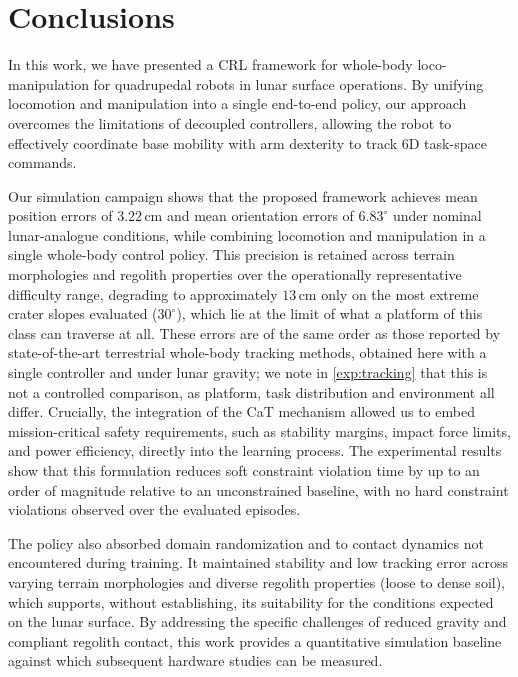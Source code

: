 \section{Conclusions} \label{sec:conclusions}

In this work, we have presented a CRL framework for whole-body loco-manipulation for quadrupedal robots in lunar surface operations. By unifying locomotion and manipulation into a single end-to-end policy, our approach overcomes the limitations of decoupled controllers, allowing the robot to effectively coordinate base mobility with arm dexterity to track 6D task-space commands.

Our simulation campaign shows that the proposed framework achieves mean position errors of $3.22\,$cm and mean orientation errors of $6.83^{\circ}$ under nominal lunar-analogue conditions, while combining locomotion and manipulation in a single whole-body control policy. This precision is retained across terrain morphologies and regolith properties over the operationally representative difficulty range, degrading to approximately $13\,$cm only on the most extreme crater slopes evaluated ($30^{\circ}$), which lie at the limit of what a platform of this class can traverse at all. These errors are of the same order as those reported by state-of-the-art terrestrial whole-body tracking methods, obtained here with a single controller and under lunar gravity; we note in \cref{exp:tracking} that this is not a controlled comparison, as platform, task distribution and environment all differ. Crucially, the integration of the CaT mechanism allowed us to embed mission-critical safety requirements, such as stability margins, impact force limits, and power efficiency, directly into the learning process. The experimental results show that this formulation reduces soft constraint violation time by up to an order of magnitude relative to an unconstrained baseline, with no hard constraint violations observed over the evaluated episodes.

The policy also absorbed domain randomization and to contact dynamics not encountered during training. It maintained stability and low tracking error across varying terrain morphologies and diverse regolith properties (loose to dense soil), which supports, without establishing, its suitability for the conditions expected on the lunar surface. By addressing the specific challenges of reduced gravity and compliant regolith contact, this work provides a quantitative simulation baseline against which subsequent hardware studies can be measured.


